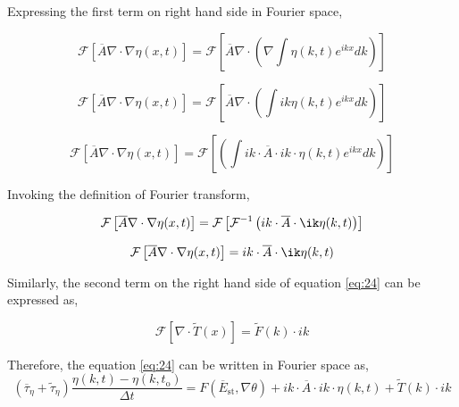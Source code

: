 \documentclass[a4paper,11pt,dvipsnames]{article}
\begin{document}
Expressing the first term on right hand side in Fourier space, 

\begin{equation}
	\mathcal{F} \left [ \overline{A} \nabla \cdot \nabla \eta (x,t) \right ] = \mathcal{F} \left [ \overline{A} \nabla \cdot \left ( \nabla \int \eta (k,t) e^{ikx} dk \right ) \right ] \label{eq:25}
\end{equation}

\begin{equation}
	\mathcal{F} \left [ \overline{A} \nabla \cdot \nabla \eta (x,t) \right ] = \mathcal{F} \left [ \overline{A} \nabla \cdot \left ( \int ik \eta (k,t) e^{ikx} dk \right ) \right ] \label{eq:26}
\end{equation}

\begin{equation}
	\mathcal{F} \left [ \overline{A} \nabla \cdot \nabla \eta (x,t) \right ] = \mathcal{F} \left [\left ( \int ik \cdot \overline{A} \cdot ik \cdot \eta (k,t) e^{ikx} dk \right ) \right ] \label{eq:27}
\end{equation}

Invoking the definition of Fourier transform, 

\begin{equation}
	\mathcal{F} \left [ \overline{A} \nabla \cdot \nabla \eta (x,t) \right ] = \mathcal{F} \left [ \mathcal{F}^{-1} \left ( ik \cdot \overline{A} \cdot \ik \eta (k,t) \right ) \right ] \label{eq:28}
\end{equation}

\begin{equation}
	\mathcal{F} \left [ \overline{A} \nabla \cdot \nabla \eta (x,t) \right ] = ik \cdot \overline{A} \cdot \ik \eta (k,t) \label{eq:29}
\end{equation}

Similarly, the second term on the right hand side of equation \ref{eq:24} can be expressed as,

\begin{equation}
	\mathcal{F} \left [ \nabla \cdot \tilde{T}(x) \right ] = \tilde{F}(k) \cdot ik \label{eq:30}
\end{equation}

Therefore, the equation \ref{eq:24} can be written in Fourier space as, 
\begin{equation}
	( \overline{\tau}_{\eta} + \tilde{\tau}_{\eta} ) \frac{\eta(k,t) - \eta(k,t_{\text{o}})}{\Delta t} = 
	F(\overline{E}_{\text{st}} , \nabla \theta ) 
	+ ik \cdot \overline{A} \cdot ik \cdot \eta (k,t) + \tilde{T}(k) \cdot ik \label{eq:30}
\end{equation}
\end{document}
